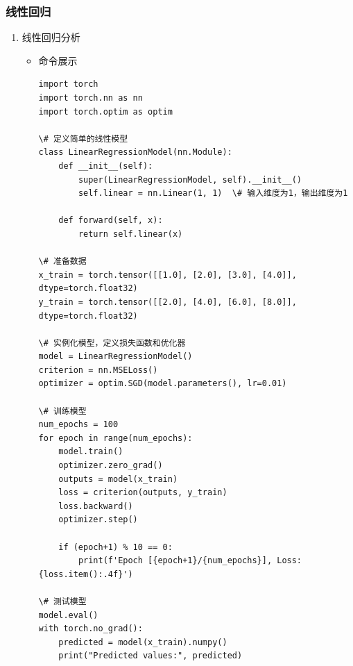 \documentclass[UTF8]{ctexart}
\begin{document}
\subsubsection{线性回归}

\begin{enumerate}
  \item 线性回归分析
  \begin{itemize}
  \item 命令展示
  \begin{verbatim}
import torch
import torch.nn as nn
import torch.optim as optim

\# 定义简单的线性模型
class LinearRegressionModel(nn.Module):
    def __init__(self):
        super(LinearRegressionModel, self).__init__()
        self.linear = nn.Linear(1, 1)  \# 输入维度为1，输出维度为1

    def forward(self, x):
        return self.linear(x)

\# 准备数据
x_train = torch.tensor([[1.0], [2.0], [3.0], [4.0]], dtype=torch.float32)
y_train = torch.tensor([[2.0], [4.0], [6.0], [8.0]], dtype=torch.float32)

\# 实例化模型，定义损失函数和优化器
model = LinearRegressionModel()
criterion = nn.MSELoss()
optimizer = optim.SGD(model.parameters(), lr=0.01)

\# 训练模型
num_epochs = 100
for epoch in range(num_epochs):
    model.train()
    optimizer.zero_grad()
    outputs = model(x_train)
    loss = criterion(outputs, y_train)
    loss.backward()
    optimizer.step()

    if (epoch+1) % 10 == 0:
        print(f'Epoch [{epoch+1}/{num_epochs}], Loss: {loss.item():.4f}')

\# 测试模型
model.eval()
with torch.no_grad():
    predicted = model(x_train).numpy()
    print("Predicted values:", predicted)


    
  \end{verbatim}


\end{itemize}
\end{enumerate}
\end{document}
